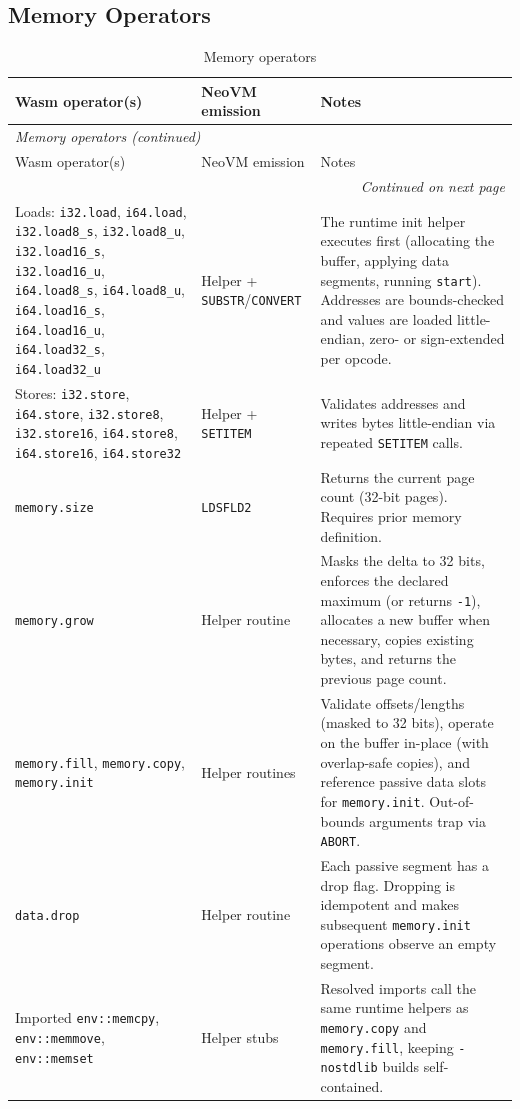 \documentclass[11pt]{article}
\begin{document}
\subsection{Memory Operators}
\begin{longtable}{@{}p{4.7cm}p{3.8cm}p{6.5cm}@{}}
\caption{Memory operators}\\
\toprule
Wasm operator(s) & NeoVM emission & Notes \\
\midrule
\endfirsthead
\multicolumn{3}{l}{\textit{Memory operators (continued)}}\\
\toprule
Wasm operator(s) & NeoVM emission & Notes \\
\midrule
\endhead
\midrule
\multicolumn{3}{r}{\textit{Continued on next page}}\\
\bottomrule
\endfoot
\bottomrule
\endlastfoot
Loads: \texttt{i32.load}, \texttt{i64.load}, \texttt{i32.load8\_s}, \texttt{i32.load8\_u}, \texttt{i32.load16\_s}, \texttt{i32.load16\_u}, \texttt{i64.load8\_s}, \texttt{i64.load8\_u}, \texttt{i64.load16\_s}, \texttt{i64.load16\_u}, \texttt{i64.load32\_s}, \texttt{i64.load32\_u} & Helper + \texttt{SUBSTR}/\texttt{CONVERT} & The runtime init helper executes first (allocating the buffer, applying data segments, running \texttt{start}). Addresses are bounds-checked and values are loaded little-endian, zero- or sign-extended per opcode.
\tabularnewline
Stores: \texttt{i32.store}, \texttt{i64.store}, \texttt{i32.store8}, \texttt{i32.store16}, \texttt{i64.store8}, \texttt{i64.store16}, \texttt{i64.store32} & Helper + \texttt{SETITEM} & Validates addresses and writes bytes little-endian via repeated \texttt{SETITEM} calls.
\tabularnewline
\texttt{memory.size} & \texttt{LDSFLD2} & Returns the current page count (32-bit pages). Requires prior memory definition.
\tabularnewline
\texttt{memory.grow} & Helper routine & Masks the delta to 32 bits, enforces the declared maximum (or returns \texttt{-1}), allocates a new buffer when necessary, copies existing bytes, and returns the previous page count.
\tabularnewline
\texttt{memory.fill}, \texttt{memory.copy}, \texttt{memory.init} & Helper routines & Validate offsets/lengths (masked to 32 bits), operate on the buffer in-place (with overlap-safe copies), and reference passive data slots for \texttt{memory.init}. Out-of-bounds arguments trap via \texttt{ABORT}.
\tabularnewline
\texttt{data.drop} & Helper routine & Each passive segment has a drop flag. Dropping is idempotent and makes subsequent \texttt{memory.init} operations observe an empty segment.
\tabularnewline
Imported \texttt{env::memcpy}, \texttt{env::memmove}, \texttt{env::memset} & Helper stubs & Resolved imports call the same runtime helpers as \texttt{memory.copy} and \texttt{memory.fill}, keeping \texttt{-nostdlib} builds self-contained.
\tabularnewline
\end{longtable}
\end{document}
